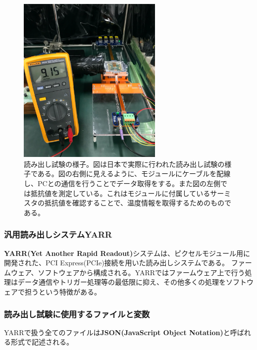 \begin{figure}[bpt]\centering
\includegraphics[width=7cm]{readout_overview}
\caption[読み出し試験の様子]{読み出し試験の様子\cite{3-4}。図は日本で実際に行われた読み出し試験の様子である。図の右側に見えるように、モジュールにケーブルを配線し、PCとの通信を行うことでデータ取得をする。また図の左側では抵抗値を測定している。これはモジュールに付属しているサーミスタの抵抗値を確認することで、温度情報を取得するためのものである。}
\label{readout_overview}
\end{figure}

\subsubsection{汎用読み出しシステムYARR}
\textbf{YARR(Yet Another Rapid Readout)}システム\cite{3-3}は、ピクセルモジュール用に開発された、PCI Express(PCIe)接続を用いた読み出しシステムである。
ファームウェア、ソフトウェアから構成される。YARRではファームウェア上で行う処理はデータ通信やトリガー処理等の最低限に抑え、その他多くの処理をソフトウェアで担うという特徴がある。

\subsubsection{読み出し試験に使用するファイルと変数}
YARRで扱う全てのファイルは\textbf{JSON(JavaScript Object Notation)}と呼ばれる形式で記述される。

